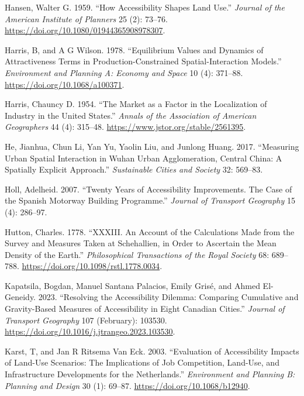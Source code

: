 \documentclass[
]{article}
\newlength{\cslhangindent}
\newenvironment{CSLReferences}[2] %
 {\begin{list}{}{%
  \setlength{\itemindent}{0pt}
  \setlength{\leftmargin}{0pt}
  \setlength{\parsep}{0pt}
  \ifodd #1
   \setlength{\leftmargin}{\cslhangindent}
   \setlength{\itemindent}{-1\cslhangindent}
  \fi
  \setlength{\itemsep}{#2\baselineskip}}}
 {\end{list}}
\begin{document}
\begin{CSLReferences}{1}{0}
Hansen, Walter G. 1959. {``How Accessibility Shapes Land Use.''}
\emph{Journal of the American Institute of Planners} 25 (2): 73--76.
\url{https://doi.org/10.1080/01944365908978307}.

Harris, B, and A G Wilson. 1978. {``Equilibrium Values and Dynamics of
Attractiveness Terms in Production-Constrained Spatial-Interaction
Models.''} \emph{Environment and Planning A: Economy and Space} 10 (4):
371--88. \url{https://doi.org/10.1068/a100371}.

Harris, Chauncy D. 1954. {``The {Market} as a {Factor} in the
{Localization} of {Industry} in the {United} {States}.''} \emph{Annals
of the Association of American Geographers} 44 (4): 315--48.
\url{https://www.jstor.org/stable/2561395}.

He, Jianhua, Chun Li, Yan Yu, Yaolin Liu, and Junlong Huang. 2017.
{``Measuring Urban Spatial Interaction in Wuhan Urban Agglomeration,
Central China: A Spatially Explicit Approach.''} \emph{Sustainable
Cities and Society} 32: 569--83.

Holl, Adelheid. 2007. {``Twenty Years of Accessibility Improvements. The
Case of the Spanish Motorway Building Programme.''} \emph{Journal of
Transport Geography} 15 (4): 286--97.

Hutton, Charles. 1778. {``{XXXIII}. {An} Account of the Calculations
Made from the Survey and Measures Taken at {Schehallien}, in Order to
Ascertain the Mean Density of the {Earth}.''} \emph{Philosophical
Transactions of the Royal Society} 68: 689--788.
\url{https://doi.org/10.1098/rstl.1778.0034}.

Kapatsila, Bogdan, Manuel Santana Palacios, Emily Grisé, and Ahmed
El-Geneidy. 2023. {``Resolving the Accessibility Dilemma: {Comparing}
Cumulative and Gravity-Based Measures of Accessibility in Eight
{Canadian} Cities.''} \emph{Journal of Transport Geography} 107
(February): 103530.
\url{https://doi.org/10.1016/j.jtrangeo.2023.103530}.

Karst, T, and Jan R Ritsema Van Eck. 2003. {``Evaluation of
Accessibility Impacts of Land-Use Scenarios: The Implications of Job
Competition, Land-Use, and Infrastructure Developments for the
Netherlands.''} \emph{Environment and Planning B: Planning and Design}
30 (1): 69--87. \url{https://doi.org/10.1068/b12940}.


\end{CSLReferences}
\end{document}
